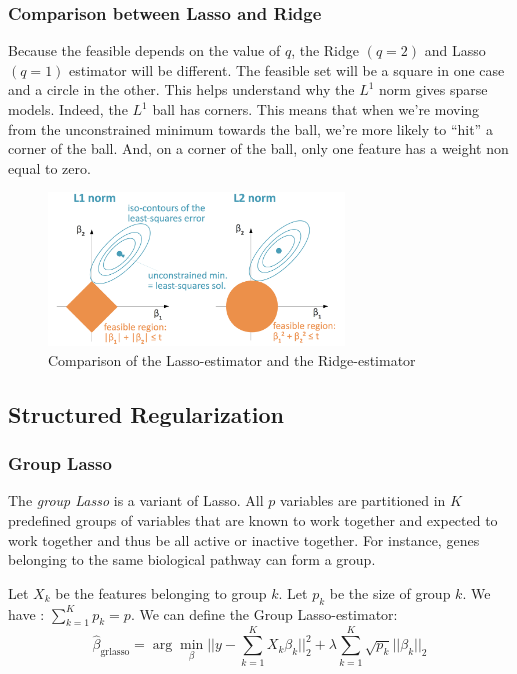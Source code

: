 \documentclass[a4paper,12pt]{article}
\begin{document}
\subsubsection{Comparison between Lasso and Ridge}
Because the feasible depends on the value of $q$, the Ridge $(q = 2)$ and Lasso $(q = 1)$ estimator will be different. The feasible set will be a square in one case and a circle in the other. This helps understand why the $L^1$ norm gives sparse models. Indeed, the $L^1$ ball has corners. This means that when we're moving from the unconstrained minimum towards the ball, we're more likely to ``hit'' a corner of the ball. And, on a corner of the ball, only one feature has a weight non equal to zero.

\begin{figure}[!h]
\centerline{
\includegraphics[width = 0.7\textwidth]{figures/comparison.png}}
\caption{Comparison of the Lasso-estimator and the Ridge-estimator}
\label{Comparison}
\end{figure}

\subsection{Structured Regularization}
\subsubsection{Group Lasso}
The \emph{group Lasso} is a variant of Lasso. All $p$ variables are partitioned in $K$ predefined groups of variables that are known to work together and expected to work together and thus be all active or inactive together. For instance, genes belonging to the same biological pathway can form a group.

Let $X_k$ be the features belonging to group $k$. Let $p_k$ be the size of group $k$. We have : $\sum_{k = 1}^K{p_k} = p$. We can define the Group Lasso-estimator:
\[ \hat{\beta}_\text{grlasso} = \arg \min_\beta ||y - \sum_{k = 1}^K{X_k\beta_k}||_2^2 + \lambda \sum_{k = 1}^K{\sqrt{p_k}||\beta_k||_2}\]
\end{document}
